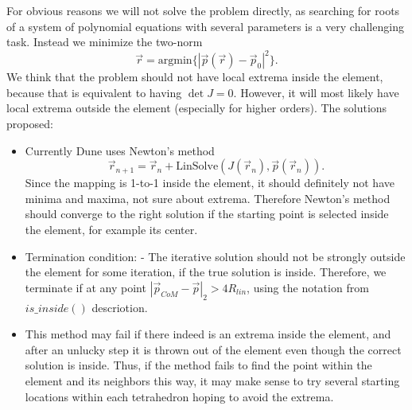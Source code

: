 \noindent
For obvious reasons we will not solve the problem directly, as searching for roots of a system of polynomial equations with several parameters is a very challenging task. Instead we minimize the two-norm \[\vec{r} = \mathrm{argmin} \{ |\vec{p}(\vec{r}) - \vec{p}_0 |^2 \}. \] We think that the problem should not have local extrema inside the element, because that is equivalent to having $\det J = 0$. However, it will most likely have local extrema outside the element (especially for higher orders). The solutions proposed:
\begin{itemize}
	\item Currently Dune uses Newton's method \[\vec{r}_{n+1} = \vec{r}_n + \mathrm{LinSolve}(J(\vec{r}_n), \vec{p}(\vec{r}_n) ). \] Since the mapping is 1-to-1 inside the element, it should definitely not have minima and maxima, not sure about extrema. Therefore Newton's method should converge to the right solution if the starting point is selected inside the element, for example its center.
	
	\item Termination condition:
		- The iterative solution should not be strongly outside the element for some iteration, if the true solution is inside. Therefore, we terminate if at any point $|\vec{p}_{CoM} - \vec{p}|_2 > 4 R_{lin}$, using the notation from $is\_inside()$ descriotion.
	
	\item This method may fail if there indeed is an extrema inside the element, and after an unlucky step it is thrown out of the element even though the correct solution is inside. Thus, if the method fails to find the point within the element and its neighbors this way, it may make sense to try several starting locations within each tetrahedron hoping to avoid the extrema.
\end{itemize}
